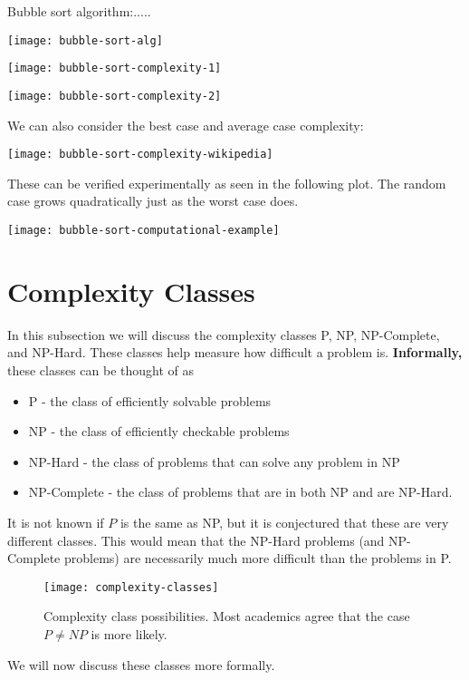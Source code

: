 \documentclass[../open-optimization/open-optimization.tex]{subfiles}
\begin{document}
Bubble sort algorithm:.....


\texttt{[image: bubble-sort-alg]}

\texttt{[image: bubble-sort-complexity-1]}

\texttt{[image: bubble-sort-complexity-2]}

We can also consider the best case and average case complexity:

\texttt{[image: bubble-sort-complexity-wikipedia]}

These can be verified experimentally  as seen in the following plot.  The random case grows quadratically just as the worst case does.  

\texttt{[image: bubble-sort-computational-example]}


\section{Complexity Classes}
In this subsection we will discuss the complexity classes P, NP, NP-Complete, and NP-Hard.  These classes help measure how difficult a problem is.  \textbf{Informally,} these classes can be thought of as 
\begin{itemize}
\item P - the class of efficiently solvable problems
\item NP - the class of efficiently checkable problems
\item NP-Hard - the class of problems that can solve any problem in NP
\item NP-Complete - the class of problems that are in both NP and are NP-Hard.
\end{itemize}
It is not known if $P$ is the same as NP, but it is conjectured that these are very different classes.  This would mean that the NP-Hard problems (and NP-Complete problems) are necessarily much more difficult than the problems in P.
\begin{figure}[H]
\begin{center}
\texttt{[image: complexity-classes]} \footnotemark

\end{center}
\label{fig:complexity-classes}
\caption{Complexity class possibilities.  Most academics agree that the case $P \neq NP$ is more likely.}
\end{figure}

We will now discuss these classes more formally.
\end{document}
